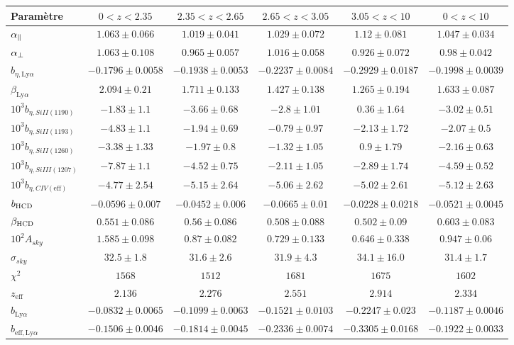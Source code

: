 \documentclass[11pt, twoside, a4paper, openright]{report}
\begin{document}
\begin{table}[]
\begin{tabular}{lccccc}
\toprule
Param\`etre  & $\num{0} < z < \num{2.35}$ & $\num{2.35} < z < \num{2.65}$ & $\num{2.65} < z < \num{3.05}$ & $\num{3.05} < z < \num{10}$  & $\num{0} < z < \num{10}$ \\
\midrule
$\alpha_{\parallel}{} $ & $ 1.063 \pm 0.066$ & $ 1.019 \pm 0.041$ & $ 1.029 \pm 0.072$ & $ 1.12 \pm 0.081$ & $ 1.047 \pm 0.034$ \\
$\alpha_{\perp}{} $ & $ 1.063 \pm 0.108$ & $ 0.965 \pm 0.057$ & $ 1.016 \pm 0.058$ & $ 0.926 \pm 0.072$ & $ 0.98 \pm 0.042$ \\
$b_{\eta, \mathrm{Ly}\alpha} $ & $ -0.1796 \pm 0.0058$ & $ -0.1938 \pm 0.0053$ & $ -0.2237 \pm 0.0084$ & $ -0.2929 \pm 0.0187$ & $ -0.1998 \pm 0.0039$ \\
$\beta_{\mathrm{Ly}\alpha} $ & $ 2.094 \pm 0.21$ & $ 1.711 \pm 0.133$ & $ 1.427 \pm 0.138$ & $ 1.265 \pm 0.194$ & $ 1.633 \pm 0.087$ \\
$10^3 b_{\eta, SiII(1190)} $ & $ -1.83 \pm 1.1$ & $ -3.66 \pm 0.68$ & $ -2.8 \pm 1.01$ & $ 0.36 \pm 1.64$ & $ -3.02 \pm 0.51$ \\
$10^3 b_{\eta, SiII(1193)} $ & $ -4.83 \pm 1.1$ & $ -1.94 \pm 0.69$ & $ -0.79 \pm 0.97$ & $ -2.13 \pm 1.72$ & $ -2.07 \pm 0.5$ \\
$10^3 b_{\eta, SiII(1260)} $ & $ -3.38 \pm 1.33$ & $ -1.97 \pm 0.8$ & $ -1.32 \pm 1.05$ & $ 0.9 \pm 1.79$ & $ -2.16 \pm 0.63$ \\
$10^3 b_{\eta, SiIII(1207)} $ & $ -7.87 \pm 1.1$ & $ -4.52 \pm 0.75$ & $ -2.11 \pm 1.05$ & $ -2.89 \pm 1.74$ & $ -4.59 \pm 0.52$ \\
$10^3 b_{\eta, CIV(\mathrm{eff})} $ & $ -4.77 \pm 2.54$ & $ -5.15 \pm 2.64$ & $ -5.06 \pm 2.62$ & $ -5.02 \pm 2.61$ & $ -5.12 \pm 2.63$ \\
$b_{\textsc{HCD}} $ & $ -0.0596 \pm 0.007$ & $ -0.0452 \pm 0.006$ & $ -0.0665 \pm 0.01$ & $ -0.0228 \pm 0.0218$ & $ -0.0521 \pm 0.0045$ \\
$\beta_{\textsc{HCD}} $ & $ 0.551 \pm 0.086$ & $ 0.56 \pm 0.086$ & $ 0.508 \pm 0.088$ & $ 0.502 \pm 0.09$ & $ 0.603 \pm 0.083$ \\
$10^2 A_{sky} $ & $ 1.585 \pm 0.098$ & $ 0.87 \pm 0.082$ & $ 0.729 \pm 0.133$ & $ 0.646 \pm 0.338$ & $ 0.947 \pm 0.06$ \\
$\sigma_{sky} $ & $ 32.5 \pm 1.8$ & $ 31.6 \pm 2.6$ & $ 31.9 \pm 4.3$ & $ 34.1 \pm 16.0$ & $ 31.4 \pm 1.7$ \\
\midrule
$\chi^2$ & $ 1568 $ & $ 1512 $ & $ 1681 $ & $ 1675 $ & $ 1602 $ \\
$z_{\mathrm{eff}}$ & $ 2.136 $ & $ 2.276 $ & $ 2.551 $ & $ 2.914 $ & $ 2.334 $ \\
\midrule
$b_{\mathrm{Ly}\alpha} $ & $ -0.0832 \pm 0.0065$ & $ -0.1099 \pm 0.0063$ & $ -0.1521 \pm 0.0103$ & $ -0.2247 \pm 0.023$ & $ -0.1187 \pm 0.0046$ \\
$b_{\mathrm{eff}, \mathrm{Ly}\alpha} $ & $ -0.1506 \pm 0.0046$ & $ -0.1814 \pm 0.0045$ & $ -0.2336 \pm 0.0074$ & $ -0.3305 \pm 0.0168$ & $ -0.1922 \pm 0.0033$ \\
\bottomrule
\end{tabular}
\end{table}
\end{document}
